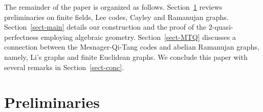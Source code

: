 \documentclass{amsart}
\numberwithin{equation}{section}
\begin{document}

The remainder of the paper is organized as follows. Section~\ref{sect-prelim} reviews preliminaries on finite fields, Lee codes, Cayley and Ramanujan graphs. Section~\ref{sect-main} details our construction and the proof of the $2$-quasi-perfectness employing algebraic geometry.
Section~\ref{sect-MTQ} discusses a connection between the Mesnager-Qi-Tang codes and abelian Ramanujan graphs, namely, Li's graphs and finite Euclidean graphs. 
We conclude this paper with several remarks in Section~\ref{sect-conc}.  


\section{Preliminaries}
\label{sect-prelim}
\end{document}
